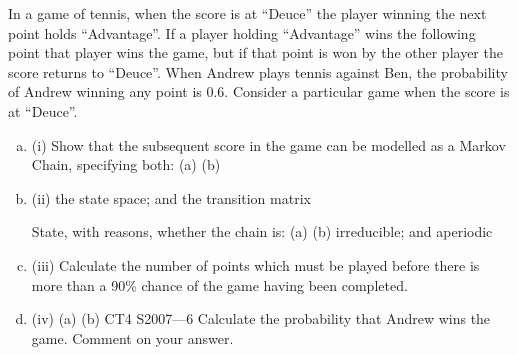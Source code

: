 \documentclass[a4paper,12pt]{article}
\begin{document}

In a game of tennis, when the score is at “Deuce” the player winning the next point
holds “Advantage”. If a player holding “Advantage” wins the following point that
player wins the game, but if that point is won by the other player the score returns to
“Deuce”.
When Andrew plays tennis against Ben, the probability of Andrew winning any point
is 0.6. Consider a particular game when the score is at “Deuce”.
\begin{enumerate}[(a)]
\item (i)
Show that the subsequent score in the game can be modelled as a Markov
Chain, specifying both:
(a)
(b)
\item (ii)
the state space; and
the transition matrix

State, with reasons, whether the chain is:
(a)
(b)
irreducible; and
aperiodic

\item (iii) Calculate the number of points which must be played before there is more than
a 90\% chance of the game having been completed.

\item (iv) (a)
(b)
CT4 S2007—6
Calculate the probability that Andrew wins the game.
Comment on your answer.

\end{enumerate}
\end{document}

